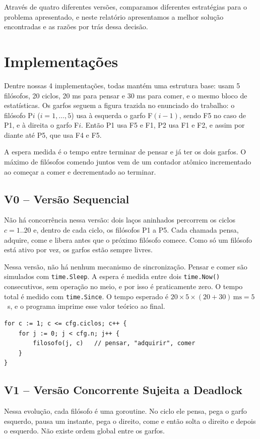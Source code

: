 \documentclass[12pt,brazil,a4paper]{article}
\begin{document}
Através de quatro diferentes versões, comparamos diferentes estratégias para o problema apresentado, e neste relatório apresentamos a melhor solução encontradas e as razões por trás dessa decisão.

\section{Implementações}
Dentre nossas 4 implementações, todas mantém uma estrutura base: usam 5 filósofos, 20 ciclos, 20 ms para pensar e 30 ms para comer, e o mesmo bloco de estatísticas. Os garfos seguem a figura trazida no enunciado do trabalho: o filósofo P$i$ ($i=1,\dots,5$) usa à esquerda o garfo F$(i-1)$, sendo F5 no caso de P1, e à direita o garfo F$i$. Então P1 usa F5 e F1, P2 usa F1 e F2, e assim por diante até P5, que usa F4 e F5.

A espera medida é o tempo entre terminar de pensar e já ter os dois garfos. O máximo de filósofos comendo juntos vem de um contador atômico incrementado ao começar a comer e decrementado ao terminar.

\subsection{V0 -- Versão Sequencial}
Não há concorrência nessa versão: dois laços aninhados percorrem os ciclos $c=1..20$ e, dentro de cada ciclo, os filósofos P1 a P5. Cada chamada pensa, adquire, come e libera antes que o próximo filósofo comece. Como só um filósofo está ativo por vez, os garfos estão sempre livres.

Nessa versão, não há nenhum mecanismo de sincronização. Pensar e comer são simulados com \texttt{time.Sleep}. A espera é medida entre dois \texttt{time.Now()} consecutivos, sem operação no meio, e por isso é praticamente zero. O tempo total é medido com \texttt{time.Since}. O tempo esperado é $20\times5\times(20+30)\,\text{ms}=5$~s, e o programa imprime esse valor teórico ao final.

\begin{lstlisting}
for c := 1; c <= cfg.ciclos; c++ {
    for j := 0; j < cfg.n; j++ {
        filosofo(j, c)   // pensar, "adquirir", comer
    }
}
\end{lstlisting}

\subsection{V1 -- Versão Concorrente Sujeita a Deadlock}
Nessa evolução, cada filósofo é uma goroutine. No ciclo ele pensa, pega o garfo esquerdo, pausa um instante, pega o direito, come e então solta o direito e depois o esquerdo. Não existe ordem global entre os garfos.
\end{document}
